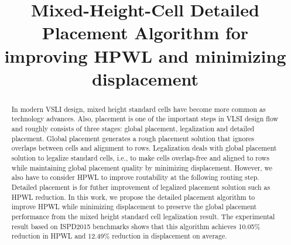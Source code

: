 \documentclass[sigconf,authordraft]{acmart}
\begin{document}
\title{Mixed-Height-Cell Detailed Placement Algorithm for improving HPWL and minimizing displacement}


\author{ }
\affiliation{%
  \institution{}
  \city{}
  \country{}
}

\author{}
\affiliation{%
  \institution{}
  \city{}
  \country{}
}


\begin{abstract}
In modern VSLI design, mixed height standard cells have become more common as technology advances. Also, placement is one of the important steps in VLSI design flow and roughly consists of three stages: global placement, legalization and detailed placement. Global placement generates a rough placement solution that ignores overlaps between cells and alignment to rows. Legalization deals with global placement solution to legalize standard cells, i.e., to make cells overlap-free and aligned to rows while maintaining global placement quality by minimizing displacement. However, we also have to consider HPWL to improve routability at the following routing step. Detailed placement is for futher improvement of legalized placement solution such as HPWL reduction. In this work, we propose the detailed placement algorithm to improve HPWL while minimizing displacement to preserve the global placement performance from the mixed height standard cell legalization result. The experimental result based on ISPD2015 benchmarks shows that this algorithm achieves 10.05\% reduction in HPWL and 12.49\% reduction in displacement on average.
\end{abstract}

\end{document}
